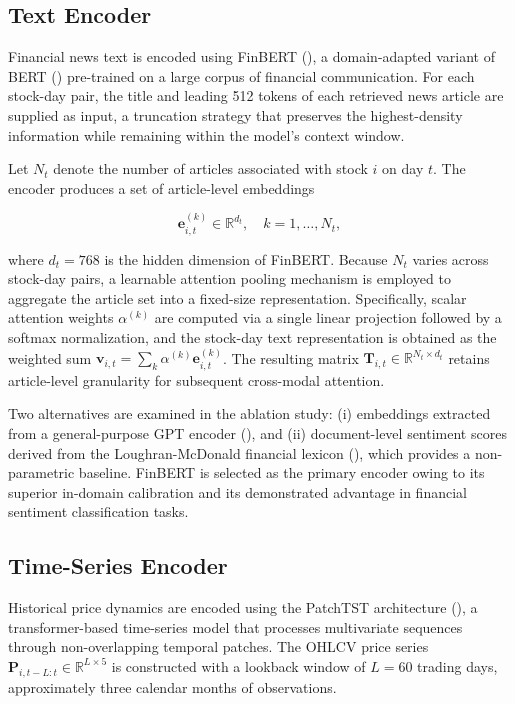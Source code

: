 \documentclass[
  11pt,
  a4paper,
]{article}
\begin{document}
\subsection{Text Encoder}\label{text-encoder}

Financial news text is encoded using FinBERT
(), a domain-adapted variant
of BERT () pre-trained on
a large corpus of financial communication. For each stock-day pair, the
title and leading 512 tokens of each retrieved news article are supplied
as input, a truncation strategy that preserves the highest-density
information while remaining within the model's context window.

Let \(N_t\) denote the number of articles associated with stock \(i\) on
day \(t\). The encoder produces a set of article-level embeddings

\[\mathbf{e}^{(k)}_{i,t} \in \mathbb{R}^{d_t}, \quad k = 1, \ldots, N_t,\]

where \(d_t = 768\) is the hidden dimension of FinBERT. Because \(N_t\)
varies across stock-day pairs, a learnable attention pooling mechanism
is employed to aggregate the article set into a fixed-size
representation. Specifically, scalar attention weights \(\alpha^{(k)}\)
are computed via a single linear projection followed by a softmax
normalization, and the stock-day text representation is obtained as the
weighted sum
\(\mathbf{v}_{i,t} = \sum_{k} \alpha^{(k)} \mathbf{e}^{(k)}_{i,t}\). The
resulting matrix \(\mathbf{T}_{i,t} \in \mathbb{R}^{N_t \times d_t}\)
retains article-level granularity for subsequent cross-modal attention.

Two alternatives are examined in the ablation study: (i) embeddings
extracted from a general-purpose GPT encoder
(), and (ii) document-level
sentiment scores derived from the Loughran-McDonald financial lexicon
(),
which provides a non-parametric baseline. FinBERT is selected as the
primary encoder owing to its superior in-domain calibration and its
demonstrated advantage in financial sentiment classification tasks.

\subsection{Time-Series Encoder}\label{time-series-encoder}

Historical price dynamics are encoded using the PatchTST architecture
(), a transformer-based
time-series model that processes multivariate sequences through
non-overlapping temporal patches. The OHLCV price series
\(\mathbf{P}_{i,t-L:t} \in \mathbb{R}^{L \times 5}\) is constructed with
a lookback window of \(L = 60\) trading days, approximately three
calendar months of observations.
\end{document}
